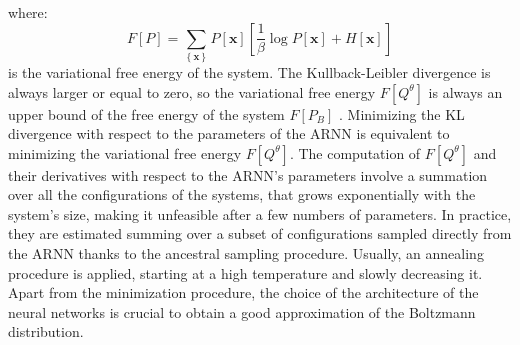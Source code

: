 \documentclass[aps,physrev,10pt,floatfix,reprint]{revtex4-2}
\begin{document}
where:
$$
F[P]= \sum_{\left\{ \mathbf{x} \right\}}P[\mathbf{x}]\left[\frac{1}{\beta}\log P[\mathbf{x}] + H[\mathbf{x}] \right] 
$$
is the variational free energy of the system. The Kullback-Leibler divergence is always larger or equal to zero, so the variational free energy $F[Q^{\theta}]$ is always an upper bound of the free energy of the system $F[P_{B}]$ \cite{Wu2019}. Minimizing the KL divergence with respect to the parameters of the ARNN is equivalent to minimizing the variational free energy $F[Q^{\theta}]$. The computation of $F[Q^{\theta}]$ and their derivatives with respect to the ARNN's parameters involve a summation over all the configurations of the systems, that grows exponentially with the system's size, making it unfeasible after a few numbers of parameters. In practice, they are estimated summing over a subset of configurations sampled directly from the ARNN thanks to the ancestral sampling procedure\cite{Wu2019}. Usually, an annealing procedure is applied, starting at a high temperature and slowly decreasing it.
Apart from the minimization procedure, the choice of the architecture of the neural networks is crucial to obtain a good approximation of the Boltzmann distribution.
\end{document}
